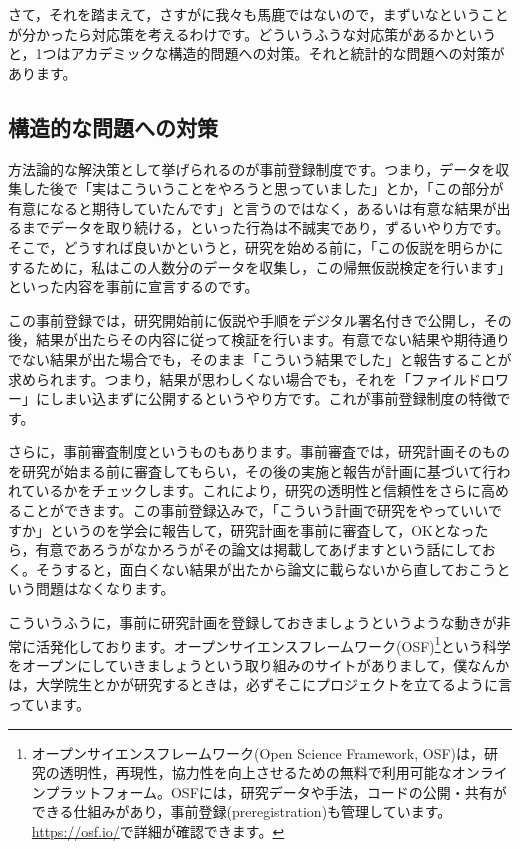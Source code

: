 \documentclass{ltjsbook}
\begin{document}
さて，それを踏まえて，さすがに我々も馬鹿ではないので，まずいなということが分かったら対応策を考えるわけです。どういうふうな対応策があるかというと，1つはアカデミックな構造的問題への対策。それと統計的な問題への対策があります。
\subsection{構造的な問題への対策}
方法論的な解決策として挙げられるのが事前登録制度です。つまり，データを収集した後で「実はこういうことをやろうと思っていました」とか，「この部分が有意になると期待していたんです」と言うのではなく，あるいは有意な結果が出るまでデータを取り続ける，といった行為は不誠実であり，ずるいやり方です。そこで，どうすれば良いかというと，研究を始める前に，「この仮説を明らかにするために，私はこの人数分のデータを収集し，この帰無仮説検定を行います」といった内容を事前に宣言するのです。

この事前登録では，研究開始前に仮説や手順をデジタル署名付きで公開し，その後，結果が出たらその内容に従って検証を行います。有意でない結果や期待通りでない結果が出た場合でも，そのまま「こういう結果でした」と報告することが求められます。つまり，結果が思わしくない場合でも，それを「ファイルドロワー」にしまい込まずに公開するというやり方です。これが事前登録制度の特徴です。

さらに，事前審査制度というものもあります。事前審査では，研究計画そのものを研究が始まる前に審査してもらい，その後の実施と報告が計画に基づいて行われているかをチェックします。これにより，研究の透明性と信頼性をさらに高めることができます。この事前登録込みで，「こういう計画で研究をやっていいですか」というのを学会に報告して，研究計画を事前に審査して，OKとなったら，有意であろうがなかろうがその論文は掲載してあげますという話にしておく。そうすると，面白くない結果が出たから論文に載らないから直しておこうという問題はなくなります。

こういうふうに，事前に研究計画を登録しておきましょうというような動きが非常に活発化しております。オープンサイエンスフレームワーク(OSF)\footnote{オープンサイエンスフレームワーク(Open Science Framework, OSF)は，研究の透明性，再現性，協力性を向上させるための無料で利用可能なオンラインプラットフォーム。OSFには，研究データや手法，コードの公開・共有ができる仕組みがあり，事前登録(preregistration)も管理しています。\url{https://osf.io/}で詳細が確認できます。}という科学をオープンにしていきましょうという取り組みのサイトがありまして，僕なんかは，大学院生とかが研究するときは，必ずそこにプロジェクトを立てるように言っています。
\end{document}
